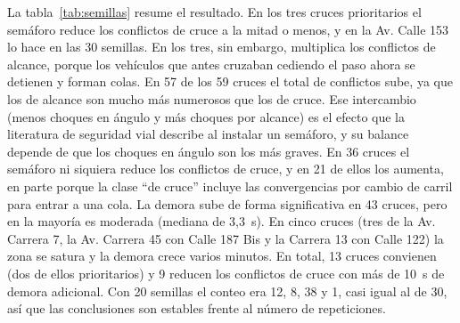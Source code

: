 \begin{table}[ht]
\renewcommand{\arraystretch}{1.15}
\centering
\small
{}
\caption[Semáforos propuestos evaluados con 30 semillas.]{Valores sin $\to$ con el semáforo propuesto, como media por hora simulada en 30 semillas. El resumen completo está en la carpeta de estudios del servicio (estudios/semillas/resumen.csv).}
\label{tab:semillas}
\end{table}

La tabla~\ref{tab:semillas} resume el resultado. En los tres cruces prioritarios el semáforo reduce los conflictos de cruce a la mitad o menos, y en la Av. Calle 153 lo hace en las 30 semillas. En los tres, sin embargo, multiplica los conflictos de alcance, porque los vehículos que antes cruzaban cediendo el paso ahora se detienen y forman colas. En 57 de los 59 cruces el total de conflictos sube, ya que los de alcance son mucho más numerosos que los de cruce. Ese intercambio (menos choques en ángulo y más choques por alcance) es el efecto que la literatura de seguridad vial describe al instalar un semáforo, y su balance depende de que los choques en ángulo son los más graves. En 36 cruces el semáforo ni siquiera reduce los conflictos de cruce, y en 21 de ellos los aumenta, en parte porque la clase “de cruce” incluye las convergencias por cambio de carril para entrar a una cola. La demora sube de forma significativa en 43 cruces, pero en la mayoría es moderada (mediana de 3,3~s). En cinco cruces (tres de la Av. Carrera 7, la Av. Carrera 45 con Calle 187 Bis y la Carrera 13 con Calle 122) la zona se satura y la demora crece varios minutos. En total, 13 cruces convienen (dos de ellos prioritarios) y 9 reducen los conflictos de cruce con más de 10~s de demora adicional. Con 20 semillas el conteo era 12, 8, 38 y 1, casi igual al de 30, así que las conclusiones son estables frente al número de repeticiones.

